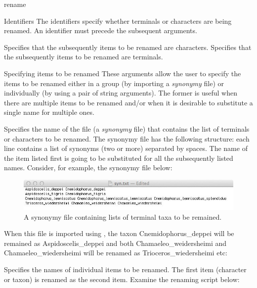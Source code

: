 \begin{command}{rename}{}
\begin{arguments}
\begin{argumentgroup}{Identifiers}
{The identifiers specify whether terminals or characters are being
renamed. An identifier must precede the subsequent arguments.}

{Specifies that the subsequently items to be renamed are characters.} 
{}
{Specifies that the subsequently items to be renamed are terminals.} 
{}
\end{argumentgroup}

\begin{argumentgroup}{Specifying items to be renamed}
{These arguments allow the user to specify the items to be renamed either in a group 
(by importing a \emph{synonymy} file) or individually (by using a pair of string arguments).
The former is useful when there are multiple items to be renamed and/or when it is
desirable to substitute a single name for multiple ones.}

{Specifies the name of the file (a \emph{synonymy} file) that contains the list of
terminals or characters to be renamed. The synonymy file has the following structure:
each line contains a list of synonyms (two or more) separated by spaces. The name of the
item listed first is going to be substituted for all the subsequently listed names. Consider,
for example, the synonymy file below:

\begin{figure}[th!]
\begin{center}
\includegraphics[width=1.0\textwidth]{doc/figures/syn.jpg}
\end{center}
\caption{A synonymy file containing lists of terminal taxa to be remained.}
\label{fig:syn}
\end{figure}

When this file is imported using , the taxon
Cnemidophorus\_deppei will be remained as Aspidoscelis\_deppei and both Chamaeleo\_weidersheimi 
and Chamaeleo\_wiedersheimi will be renamed as Trioceros\_wiedersheimi etc:}
{}

{Specifies the names of individual items to be renamed. The first item (character or taxon) is renamed
as the second item.        
Examine the renaming script below: 

}
\end{argumentgroup}
\end{arguments}
\end{command}
